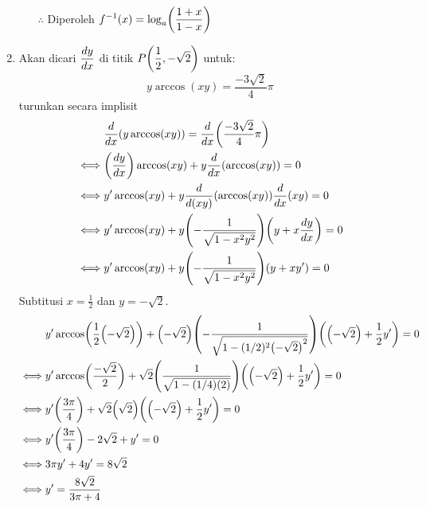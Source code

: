 \begin{enumerate}[leftmargin=*, label={\arabic*}.]
\begin{enumerate}[label={\alph*}.]
        $\therefore$ Diperoleh $\ds f^{-1}(x)=\log_{a}\brk*{\frac{1+x}{1-x}}$
    \end{enumerate}
\item Akan dicari $\displaystyle \frac{dy}{dx}$ di titik $\ds P\brk*{\frac{1}{2},-\sqrt{2}}$ untuk:
\[
y\arccos(xy) = \frac{-3\sqrt{2}}{4}\pi
\]
turunkan secara implisit
\begin{align*}
    &\drv{x}{y\arccos(xy)} = \drv{x}{\frac{-3\sqrt{2}}{4}\pi}\\
    \iff &\brk*{\frac{dy}{dx}}\arccos(xy)+y\drv{x}{\arccos(xy)} = 0\\
    \iff &y'\arccos(xy)+y\drv{(xy)}{\arccos(xy)}\drv{x}{xy} = 0\\
    \iff &y'\arccos(xy)+y\brk*{-\frac{1}{\sqrt{1-x^{2}y^{2}}}}\brk*{y+x\frac{dy}{dx}} = 0\\
    \iff &y'\arccos(xy)+y\brk*{-\frac{1}{\sqrt{1-x^{2}y^{2}}}}\brk*{y+xy'} = 0\\
\end{align*}
Subtitusi $x=\frac{1}{2}$ dan $y=-\sqrt{2}$.
\begin{align*}
    &y'\arccos\brk*{\frac{1}{2}\brk*{-\sqrt{2}}}+\brk*{-\sqrt{2}}
    \brk*{-\frac{1}{\sqrt{1-(1/2)^{2}\brk*{-\sqrt{2}}^{2}}}}
    \brk*{\brk*{-\sqrt{2}}+\frac{1}{2}y'} = 0\\
    \iff &y'\arccos\brk*{\frac{-\sqrt{2}}{2}}+\sqrt{2}
    \brk*{\frac{1}{\sqrt{1-(1/4)(2)}}}
    \brk*{\brk*{-\sqrt{2}}+\frac{1}{2}y'} = 0\\
    \iff &y'\brk*{\frac{3\pi}{4}}+\sqrt{2}\brk*{\sqrt{2}}
    \brk*{\brk*{-\sqrt{2}}+\frac{1}{2}y'} = 0\\
    \iff &y'\brk*{\frac{3\pi}{4}}-2\sqrt{2}+y'=0\\
    \iff &3\pi y'+4y'=8\sqrt{2}\\
    \iff &y'=\frac{8\sqrt{2}}{3\pi+4}\\
\end{align*}


\end{enumerate}
